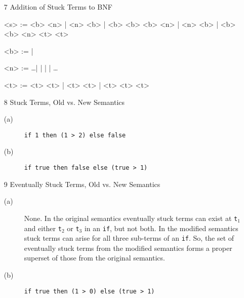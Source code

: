 \documentclass{article}
\begin{document}
\begin{description}
\begin{enumerate}
\begin{proof}
\begin{enumerate}
\begin{enumerate}
            \verb|t|$_1$ must take a step to some \verb|t|$_1''$. By the inductive hypothesis, since we know \verb|t|$_1$ steps to both \verb|t|$_1'$ and \verb|t|$_1''$,
            then \verb|t|$_1'$ and \verb|t|$_1''$ must be the same.
            \end{enumerate}


        \item E-Trans: \verb|t|$_1$ must take a step to some \verb|t|$_1'$, and \verb|t| has the form
        \verb|if t|$_1$ \verb|then t|$_2$ \verb|else t|$_3$.


      \end{enumerate}
    \end{proof}

  \item[7]{Addition of Stuck Terms to BNF}

    \begin{grammar}
      <s> :=  <b>  \lit*{+} <n> | <n> \lit*{+} <b> | <b> \lit*{+} <b>
      \alt <b>  \lit*{>} <n> | <n> \lit*{>} <b> | <b> \lit*{>} <b>
      \alt {} <n>  <t>  <t>

      <b> :=  | 

      <n> := \ldots |  |  |  | \ldots

      <t> := <t> \lit*{+} <t> | <t> \lit*{>} <t> |  <t>  <t>  <t>
    \end{grammar}

  \item[8]{Stuck Terms, Old vs. New Semantics}
    \begin{description}
      \item[(a)] \verb|if 1 then (1 > 2) else false|
      \item[(b)] \verb|if true then false else (true > 1)|
    \end{description}

  \item[9]{Eventually Stuck Terms, Old vs. New Semantics}
    \begin{description}
      \item[(a)] None. In the original semantics eventually stuck terms can exist at \verb|t|$_1$ and either \verb|t|$_2$ or \verb|t|$_3$ in an \verb|if|, but not both. In the modified semantics stuck terms can arise for all three sub-terms of an \verb|if|. So, the set of eventually stuck terms from the modified semantics forms a proper superset of those from the original semantics.
      \item[(b)] \verb|if true then (1 > 0) else (true > 1)|
    \end{description}

  \end{enumerate}

\end{description}
\end{document}
